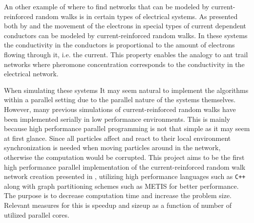 An other example of where to find networks that can be modeled by current-reinforced random walks is in certain types of electrical systems. As presented both by \citep{Current} and \cite{Doyle} the movement of the electrons in special types of current dependent conductors can be modeled by current-reinforced random walks. In these systems the conductivity in the conductors is proportional to the amount of electrons flowing through it, i.e. the current. This property enables the analogy to ant trail networks where pheromone concentration corresponds to the conductivity in the electrical network.

When simulating these systems It may seem natural to implement the algorithms within a parallel setting due to the parallel nature of the systems themselves. However, many previous simulations of current-reinforced random walks have been implemented serially in low performance environments. This is mainly because high performance parallel programming is not that simple as it may seem at first glance. Since all particles affect and react to their local environment synchronization is needed when moving particles around in the network, otherwise the computation would be corrupted. This project aims to be the first high performance parallel implementation of the current-reinforced random walk network creation presented in \cite{Current}, utilizing high performance languages such as \texttt{C++} along with graph partitioning schemes such as METIS for better performance. The purpose is to decrease computation time and increase the problem size. Relevant measures for this is speedup and sizeup as a function of number of utilized parallel cores.